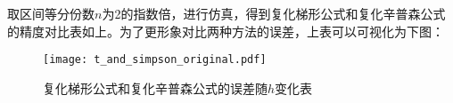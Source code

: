 取区间等分份数$n$为2的指数倍，进行仿真，得到复化梯形公式和复化辛普森公式的精度对比表如上。为了更形象对比两种方法的误差，上表可以可视化为下图：
\begin{figure}[!htp]
    \centering
    \texttt{[image: t\_and\_simpson\_original.pdf]} \\
    \caption{复化梯形公式和复化辛普森公式的误差随$h$变化表}
    \label{fig:t_and_simpson_R}
\end{figure}

